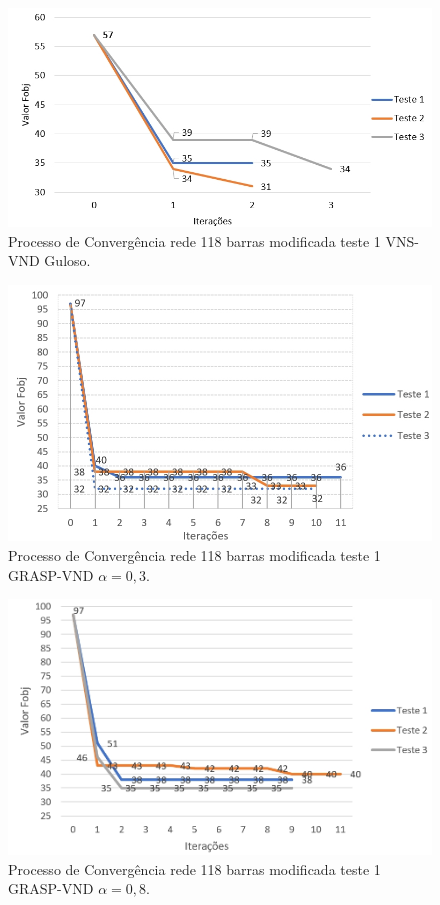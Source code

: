 \documentclass[12pt]{article}
\begin{document}
\begin{figure}[H]
	\centering 
	\includegraphics[scale=0.7]{figuras/VND_118_1_Guloso.jpg}
	\caption{Processo de Convergência rede 118 barras modificada teste 1 VNS-VND Guloso.}
	\label{fig15} %
\end{figure}


\begin{figure}[H]
	\centering 
	\includegraphics[scale=0.8]{figuras/GRASP_118_1_alpha03.jpg}
	\caption{Processo de Convergência rede 118 barras modificada teste 1 GRASP-VND $\alpha=0,3$.}
	\label{fig16} %
\end{figure}


\begin{figure}[H]
	\centering 
	\includegraphics[scale=0.75]{figuras/GRASP_118_1_alpha08.jpg}
	\caption{Processo de Convergência rede 118 barras modificada teste 1 GRASP-VND $\alpha=0,8$.}
	\label{fig17} %
\end{figure}
\end{document}
